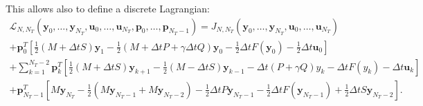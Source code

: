This allows also to define a discrete Lagrangian:
\begin{multline}
\mathcal{L}_{N,N_{T}}(\mathbf{y}_{0}, \ldots, \mathbf{y}_{N_{T}}, \mathbf{u}_{0}, \ldots, \mathbf{u}_{N_{T}},\mathbf{p}_{0}, \ldots, \mathbf{p}_{N_{T}-1}) = J_{N,N_{T}}(\mathbf{y}_{0}, \ldots, \mathbf{y}_{N_{T}}, \mathbf{u}_{0}, \ldots, \mathbf{u}_{N_{T}})  \\
 + \mathbf{p}_0^T\left[ \frac{1}{2}\left( M+\Delta t S\right) \mathbf{y}_1 - \frac{1}{2}\left( M + \Delta t P + \gamma \Delta t Q \right) \mathbf{y}_0 - \frac{1}{2}\Delta t F(\mathbf{y}_0) - \frac{1}{2}\Delta t \mathbf{u}_0 \right]\\
 +\sum_{k=1}^{N_T-2}{\mathbf{p}_k^T\left[
 \frac{1}{2}\left( M+\Delta t S\right) \mathbf{y}_{k+1} - \frac{1}{2}\left( M - \Delta t S\right) \mathbf{y}_{k-1} - \Delta t \left( P + \gamma Q\right)y_k - \Delta t F(y_k) - \Delta t \mathbf{u}_k\right]}\\
 + \mathbf{p}_{N_T-1}^T\left[ M \mathbf{y}_{N_T} - \frac{1}{2}\left( M \mathbf{y}_{N_T-1} + M \mathbf{y}_{N_T-2} \right)- \frac{1}{2}\Delta t P \mathbf{y}_{N_T - 1} - \frac{1}{2}\Delta t F(\mathbf{y}_{N_T-1}) +\frac{1}{2}\Delta t S \mathbf{y}_{N_T-2}\right].
 \label{discrlag}
 \end{multline}

